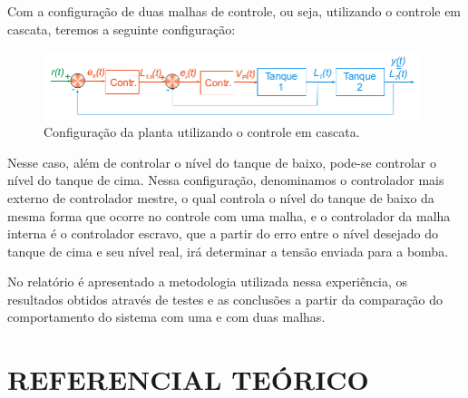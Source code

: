 \documentclass[a4paper,12pt]{article}
\begin{document}
\hspace{4ex}Com a configuração de duas malhas de controle, ou seja, utilizando o controle em cascata, teremos a seguinte configuração:

\begin{figure}[H]
\centering
\includegraphics[width=11cm]{ImagensLab4/duasmalhas.png}
\caption{Configuração da planta utilizando o controle em cascata.}
\label{duasmalha}
\end{figure}

\hspace{4ex}Nesse caso, além de controlar o nível do tanque de baixo, pode-se controlar o nível do tanque de cima. Nessa configuração, denominamos o controlador mais externo de controlador mestre, o qual controla o nível do tanque de baixo da mesma forma que ocorre no controle com uma malha, e o controlador da malha interna é o controlador escravo, que a partir do erro entre o nível desejado do tanque de cima e seu nível real, irá determinar a tensão enviada para a bomba.

\hspace{4ex}No relatório é apresentado a metodologia utilizada nessa experiência, os resultados obtidos através de testes e as conclusões a partir da comparação do comportamento do sistema com uma e com duas malhas.


\newpage


\thispagestyle{main}

\section{REFERENCIAL TEÓRICO}
\end{document}
